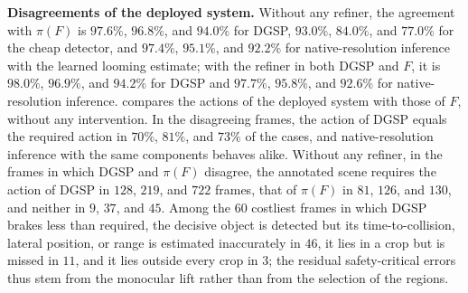 \documentclass[10pt,letterpaper]{article}
\newcommand{\method}{DGSP\xspace}
\newcommand{\full}{F}
\newcommand{\policy}{\pi}
\theoremstyle{remark}
\theoremstyle{plain}
\theoremstyle{definition}
\begin{document}
\noindent\textbf{Disagreements of the deployed system.}
Without any refiner, the agreement with $\policy(\full)$ is $97.6\%$, $96.8\%$, and $94.0\%$ for \method, $93.0\%$, $84.0\%$, and $77.0\%$ for the cheap detector, and $97.4\%$, $95.1\%$, and $92.2\%$ for native-resolution inference with the learned looming estimate; with the refiner in both \method and $\full$, it is $98.0\%$, $96.9\%$, and $94.2\%$ for \method and $97.7\%$, $95.8\%$, and $92.6\%$ for native-resolution inference.
 compares the actions of the deployed system with those of $\full$, without any intervention.
In the disagreeing frames, the action of \method equals the required action in $70\%$, $81\%$, and $73\%$ of the cases, and native-resolution inference with the same components behaves alike.
Without any refiner, in the frames in which \method and $\policy(\full)$ disagree, the annotated scene requires the action of \method in $128$, $219$, and $722$ frames, that of $\policy(\full)$ in $81$, $126$, and $130$, and neither in $9$, $37$, and $45$.
Among the $60$ costliest frames in which \method brakes less than required, the decisive object is detected but its time-to-collision, lateral position, or range is estimated inaccurately in $46$, it lies in a crop but is missed in $11$, and it lies outside every crop in $3$; the residual safety-critical errors thus stem from the monocular lift rather than from the selection of the regions.
\end{document}
